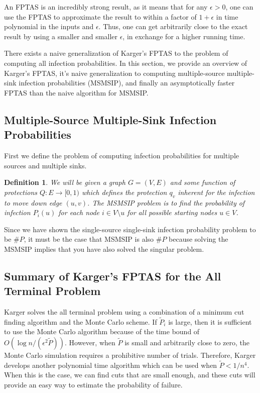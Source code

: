 \documentclass{article}
\theoremstyle{plain}
\newtheorem{definition}{Definition}
\begin{document}
An FPTAS is an incredibly strong result, as it means that for any $\epsilon > 0$, one can use the FPTAS to approximate the result to within a factor of $1 + \epsilon$ in time polynomial in the inputs and $\epsilon$. Thus, one can get arbitrarily close to the exact result by using a smaller and smaller $\epsilon$, in exchange for a higher running time.

There exists a naive generalization of Karger's FPTAS to the problem of computing all infection probabilities. In this section, we provide an overview of Karger's FPTAS, it's naive generalization to computing multiple-source multiple-sink infection probabilities (MSMSIP), and finally an asymptotically faster FPTAS than the naive algorithm for MSMSIP.

\subsection{Multiple-Source Multiple-Sink Infection Probabilities}

First we define the problem of computing infection probabilities for multiple sources and multiple sinks.

\begin{definition}
    We will be given a graph $G = (V,E)$ and some function of protections $Q: E \to [0,1)$ which defines the protection $q_v$ inherent for the infection to move down edge $(u,v)$. The \emph{MSMSIP problem} is to find the probability of infection $P_i(u)$ for each node $i \in V \setminus u$ for all possible starting nodes $u \in V$.
  \end{definition}

  Since we have shown the single-source single-sink infection probability problem to be $\# P$, it must be the case that MSMSIP is also $\# P$ because solving the MSMSIP implies that you have also solved the singular problem.

\subsection{Summary of Karger's FPTAS for the All Terminal Problem}

Karger solves the all terminal problem using a combination of a minimum cut finding algorithm and the Monte Carlo scheme. If $\tilde{P}_i$ is large, then it is sufficient to use the Monte Carlo algorithm because of the time bound of $O(\log n / (\epsilon^2 \tilde{P}))$. However, when $\tilde{P}$ is small and arbitrarily close to zero, the Monte Carlo simulation requires a prohibitive number of trials. Therefore, Karger develops another polynomial time algorithm which can be used when $\tilde{P} < 1/n^4$. When this is the case, we can find cuts that are small enough, and these cuts will provide an easy way to estimate the probability of failure.
\end{document}
